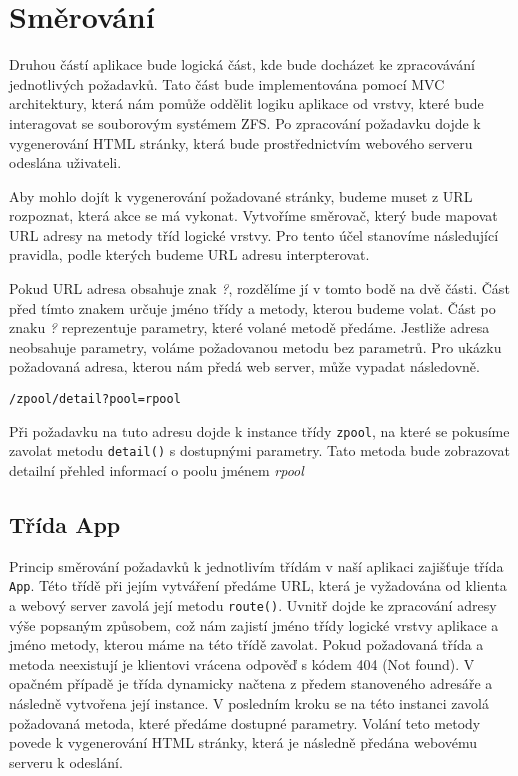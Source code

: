 \section{Směrování}
\label{route}
Druhou částí aplikace bude logická část, kde bude docházet ke zpracovávání jednotlivých požadavků. Tato část bude implementována pomocí MVC architektury, která nám pomůže oddělit logiku aplikace od vrstvy, které bude interagovat se souborovým systémem ZFS. Po zpracování požadavku dojde k vygenerování HTML stránky, která bude prostřednictvím webového serveru odeslána uživateli.

Aby mohlo dojít k vygenerování požadované stránky, budeme muset z URL rozpoznat, která akce se má vykonat. Vytvoříme směrovač, který bude mapovat URL adresy na metody tříd logické vrstvy. Pro tento účel stanovíme následující pravidla, podle kterých budeme URL adresu interpterovat.

Pokud URL adresa obsahuje znak \emph{?}, rozdělíme jí v tomto bodě na dvě části. Část před tímto znakem určuje jméno třídy a metody, kterou budeme volat. Část po znaku \emph{?} reprezentuje parametry, které volané metodě předáme. Jestliže adresa neobsahuje parametry, voláme požadovanou metodu bez parametrů. Pro ukázku požadovaná adresa, kterou nám předá web server, může vypadat následovně.
\begin{verbatim}
/zpool/detail?pool=rpool
\end{verbatim}
Při požadavku na tuto adresu dojde k instance třídy \verb|zpool|, na které se pokusíme zavolat metodu \verb|detail()| s dostupnými parametry. Tato metoda bude zobrazovat detailní přehled informací o poolu jménem \emph{rpool}
    \subsection{Třída App}
    Princip směrování požadavků k jednotlivím třídám v naší aplikaci zajišťuje třída \verb|App|. Této třídě při jejím vytváření předáme URL, která je vyžadována od klienta a webový server zavolá její metodu \verb|route()|. Uvnitř dojde ke zpracování adresy výše popsaným způsobem, což nám zajistí jméno třídy logické vrstvy aplikace a jméno metody, kterou máme na této třídě zavolat. Pokud požadovaná třída a metoda neexistují je klientovi vrácena odpověď s kódem 404 (Not found). V opačném případě je třída dynamicky načtena z předem stanoveného adresáře a následně vytvořena její instance. V posledním kroku se na této instanci zavolá požadovaná metoda, které předáme dostupné parametry. Volání teto metody povede k vygenerování HTML stránky, která je následně předána webovému serveru k odeslání.


